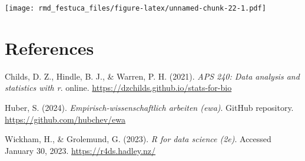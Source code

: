 \documentclass[
]{article}
\newlength{\cslhangindent}
\newlength{\cslentryspacingunit} %
\newenvironment{CSLReferences}[2] %
 {%
  \setlength{\parindent}{0pt}
  \ifodd #1
  \let\oldpar\par
  \def\par{\hangindent=\cslhangindent\oldpar}
  \fi
  \setlength{\parskip}{#2\cslentryspacingunit}
 }%
 {}
\begin{document}
\texttt{[image: rmd\_festuca\_files/figure-latex/unnamed-chunk-22-1.pdf]}

\hypertarget{references}{%
\section*{References}\label{references}}

\hypertarget{refs}{}
\begin{CSLReferences}{1}{0}
\leavevmode{}%
Childs, D. Z., Hindle, B. J., \& Warren, P. H. (2021). \emph{APS 240:
Data analysis and statistics with r}. online.
\url{https://dzchilds.github.io/stats-for-bio}

\leavevmode{}%
Huber, S. (2024). \emph{Empirisch-wissenschaftlich arbeiten (ewa)}.
GitHub repository. \url{https://github.com/hubchev/ewa}

\leavevmode{}%
Wickham, H., \& Grolemund, G. (2023). \emph{R for data science (2e)}.
Accessed January 30, 2023. \url{https://r4ds.hadley.nz/}

\end{CSLReferences}
\end{document}
